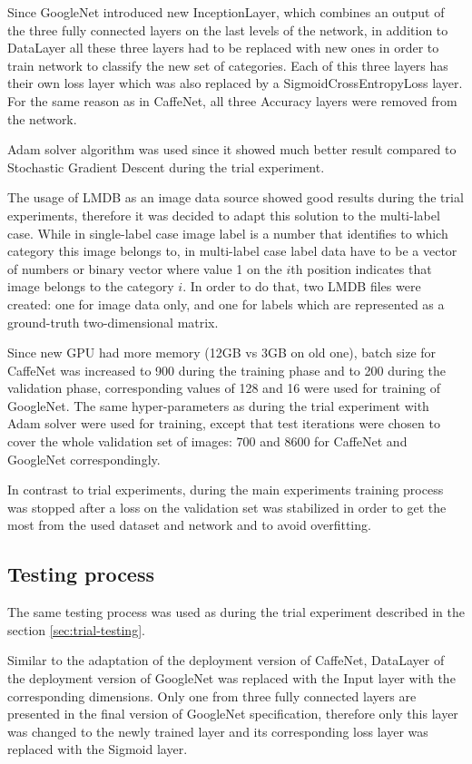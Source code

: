     Since GoogleNet introduced new InceptionLayer, which combines an output of the three fully connected layers on the last levels of the network, in addition to DataLayer all these three layers had to be replaced with new ones in order to train network to classify the new set of categories. Each of this three layers has their own loss layer which was also replaced by a SigmoidCrossEntropyLoss layer. For the same reason as in CaffeNet, all three Accuracy layers were removed from the network.
    
    Adam solver algorithm was used since it showed much better result compared to Stochastic Gradient Descent during the trial experiment.

    The usage of LMDB as an image data source showed good results during the trial experiments, therefore it was decided to adapt this solution to the multi-label case. While in single-label case image label is a number that identifies to which category this image belongs to, in multi-label case label data have to be a vector of numbers or binary vector where value 1 on the $i$th position indicates that image belongs to the category $i$. In order to do that, two LMDB files were created: one for image data only, and one for labels which are represented as a ground-truth two-dimensional matrix.  
    
    Since new GPU had more memory (12GB vs 3GB on old one), batch size for CaffeNet was increased to 900 during the training phase and to 200 during the validation phase, corresponding values of 128 and 16 were used for training of GoogleNet. The same hyper-parameters as during the trial experiment with Adam solver were used for training, except that test iterations were chosen to cover the whole validation set of images: 700 and 8600 for CaffeNet and GoogleNet correspondingly.
    
    In contrast to trial experiments, during the main experiments training process was stopped after a loss on the validation set was stabilized in order to get the most from the used dataset and network and to avoid overfitting.

    \subsection{Testing process}
    The same testing process was used as during the trial experiment described in the section \ref{sec:trial-testing}.
    
    Similar to the adaptation of the deployment version of CaffeNet, DataLayer of the deployment version of GoogleNet was replaced with the Input layer with the corresponding dimensions. Only one from three fully connected layers are presented in the final version of GoogleNet specification, therefore only this layer was changed to the newly trained layer and its corresponding loss layer was replaced with the Sigmoid layer.
    

